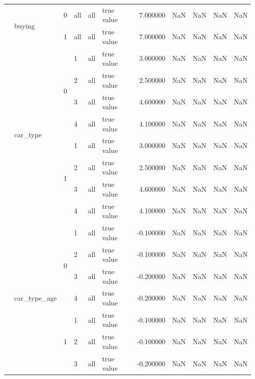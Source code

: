 \begin{tabular}{llllllrrrrr}
\cline{2-11} \cline{3-11} \cline{4-11} \cline{5-11}
 & \multirow[t]{2}{*}{buying} & 0 & all & all & true value & 7.000000 & NaN & NaN & NaN & NaN \\
\cline{3-11} \cline{4-11} \cline{5-11}
 &  & 1 & all & all & true value & 7.000000 & NaN & NaN & NaN & NaN \\
\cline{2-11} \cline{3-11} \cline{4-11} \cline{5-11}
 & \multirow[t]{8}{*}{car_type} & \multirow[t]{4}{*}{0} & 1 & all & true value & 3.000000 & NaN & NaN & NaN & NaN \\
\cline{4-11} \cline{5-11}
 &  &  & 2 & all & true value & 2.500000 & NaN & NaN & NaN & NaN \\
\cline{4-11} \cline{5-11}
 &  &  & 3 & all & true value & 4.600000 & NaN & NaN & NaN & NaN \\
\cline{4-11} \cline{5-11}
 &  &  & 4 & all & true value & 4.100000 & NaN & NaN & NaN & NaN \\
\cline{3-11} \cline{4-11} \cline{5-11}
 &  & \multirow[t]{4}{*}{1} & 1 & all & true value & 3.000000 & NaN & NaN & NaN & NaN \\
\cline{4-11} \cline{5-11}
 &  &  & 2 & all & true value & 2.500000 & NaN & NaN & NaN & NaN \\
\cline{4-11} \cline{5-11}
 &  &  & 3 & all & true value & 4.600000 & NaN & NaN & NaN & NaN \\
\cline{4-11} \cline{5-11}
 &  &  & 4 & all & true value & 4.100000 & NaN & NaN & NaN & NaN \\
\cline{2-11} \cline{3-11} \cline{4-11} \cline{5-11}
 & \multirow[t]{8}{*}{car_type_age} & \multirow[t]{4}{*}{0} & 1 & all & true value & -0.100000 & NaN & NaN & NaN & NaN \\
\cline{4-11} \cline{5-11}
 &  &  & 2 & all & true value & -0.100000 & NaN & NaN & NaN & NaN \\
\cline{4-11} \cline{5-11}
 &  &  & 3 & all & true value & -0.200000 & NaN & NaN & NaN & NaN \\
\cline{4-11} \cline{5-11}
 &  &  & 4 & all & true value & -0.200000 & NaN & NaN & NaN & NaN \\
\cline{3-11} \cline{4-11} \cline{5-11}
 &  & \multirow[t]{4}{*}{1} & 1 & all & true value & -0.100000 & NaN & NaN & NaN & NaN \\
\cline{4-11} \cline{5-11}
 &  &  & 2 & all & true value & -0.100000 & NaN & NaN & NaN & NaN \\
\cline{4-11} \cline{5-11}
 &  &  & 3 & all & true value & -0.200000 & NaN & NaN & NaN & NaN \\
\cline{4-11} \cline{5-11}

\end{tabular}
